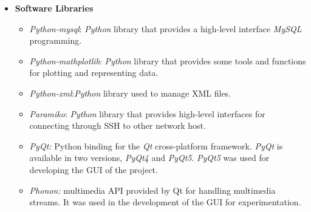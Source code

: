 \begin{itemize}
\begin{itemize}
\item{\emph{\LaTeX}}:is a document mark-up language widely used for the
  communication and publication of scientific documents~\cite{Oetiker2014}. It is multiplatform and is distributed under \ac{GPL} v3.
\item{\emph{GIMP}}: is the \emph{GNU Image Manipulation Program}. It provides photo retouching, image composition and image authoring among
  others. It is multiplatform and is distributed under \ac{GPL} v3.
\item{\emph{Dia}}: multiplatform software for drawing many types of
  schemes. Some design schemes of this document were performed on it.
\item \emph{Libre Office:} free open source office suite, developed by \emph{The
      Document Foundation}. This suite provides such software as \emph{Draw} and
    \emph{Writer} among other programs. 
\end{itemize}

\item \textbf{Software Libraries}

\begin{itemize}
\item{\emph{Python-mysql}}: \emph{Python} library that provides a high-level interface
  \emph{MySQL} programming. 
\item{\emph{Python-mathplotlib}}: \emph{Python} library that provides some tools and
  functions for plotting and representing data. 
\item{\emph{Python-xml}}:\emph{Python} library used to manage \ac{XML} files.
\item{\emph{Paramiko}}: \emph{Python} library that provides high-level interfaces for
  connecting through \ac{SSH} to other network host. 
\item \emph{PyQt:} Python binding for the \emph{Qt} cross-platform framework. \emph{PyQt} is
  available in two versions, \emph{PyQt4} and \emph{PyQt5}. \emph{PyQt5} was
  used for developing the \acs{GUI} of the project. 
\item \emph{Phonon:} multimedia \ac{API} provided by Qt for handling multimedia
  streams. It was used in the development of the \ac{GUI} for experimentation.
\end{itemize}
\end{itemize}
